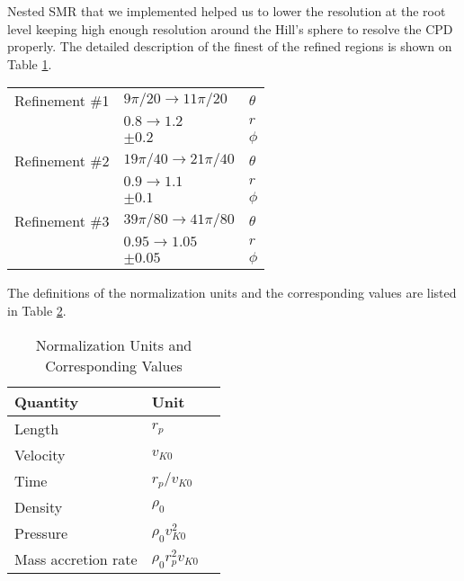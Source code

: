 \documentclass[twocolumn]{aastex631}
\begin{document}
Nested SMR that we implemented helped us to lower the resolution at the root level keeping high enough resolution around the Hill's 
sphere to resolve the CPD properly. The detailed description of the finest of the refined regions is shown on Table \ref{tab:smr}.
%
\begin{table}[]
    \label{tab:smr}
    \begin{tabular}{lll}
                   &                                 &          \\ \hline \hline
    Refinement \#1 & $9\pi/20 \rightarrow 11\pi/20$  & $\theta$ \\
                   & $0.8 \rightarrow 1.2$           & $r$      \\
                   & $\pm 0.2$                       & $\phi$   \\ \hline
    Refinement \#2 & $19\pi/40 \rightarrow 21\pi/40$ & $\theta$ \\
                   & $0.9 \rightarrow 1.1$           & $r$      \\
                   & $\pm 0.1$                       & $\phi$   \\ \hline
    Refinement \#3 & $39\pi/80 \rightarrow 41\pi/80$ & $\theta$ \\
                   & $0.95 \rightarrow 1.05$         & $r$      \\ 
                   & $\pm 0.05$                      & $\phi$  \\ \hline
    \end{tabular}
\end{table}
%
The definitions of the normalization units and the corresponding values are listed in Table \ref{tab:units}.
%
\begin{table}[]
    \label{tab:units}
    \caption{Normalization Units and Corresponding Values}
    \begin{tabular}{lll}
    \hline \hline
    Quantity            & Unit                  \\ \hline
    Length              & $r_p$                  \\
    Velocity            & $v_{K0}$                 \\
    Time                & $r_p/v_{K0}$             \\
    Density             & $\rho_0$                 \\
    Pressure            & $\rho_0 v_{K0}^2$             \\
    Mass accretion rate & $\rho_0 r_p^2 v_{K0}$               \\ \hline
    \end{tabular}
\end{table}
%
\end{document}
